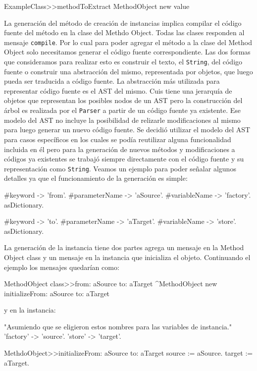 \begin{code}
ExampleClass>>methodToExtract MethodObject new value
\end{code}

La generación del método de creación de instancias implica compilar el código
fuente del método en la clase del Methdo Object. Todas las clases responden al
mensaje \lstinline{compile}. Por lo cual para poder agregar el método a la clase
del Method Object solo necesitamos generar el código fuente correspondiente. Las
dos formas que consideramos para realizar esto es construir el texto, el
\lstinline{String}, del código fuente o construir una abstracción del mismo,
representada por objetos, que luego pueda ser traducida a código fuente. La
abstracción más utilizada para representar código fuente es el AST del
mismo. Cuis tiene una jerarquía de objetos que representan los posibles nodos de
un AST pero la construcción del árbol es realizada por el \lstinline{Parser} a
partir de un código fuente ya existente. Ese modelo del AST no incluye la
posibilidad de relizarle modificaciones al mismo para luego generar un nuevo
código fuente. Se decidió utilizar el modelo del AST para casos específicos en
los cuales se podía reutilizar alguna funcionalidad incluida en él pero para la
generación de nuevos métodos y modificaciones a códigos ya existentes se trabajó
siempre directamente con el código fuente y su representación como
\lstinline{String}. Veamos un ejemplo para poder señalar algunos detalles ya que
el funcionamiento de la generación es simple:

\begin{code}
    { { #keyword -> 'from'.  #parameterName -> 'aSource'.  #variableName ->
        'factory'.  } asDictionary.

        { #keyword -> 'to'.  #parameterName -> 'aTarget'.  #variableName ->
          'store'.  } asDictionary.  }
\end{code}

La generación de la instancia tiene dos partes agrega un mensaje en la Method
Object class y un mensaje en la instancia que inicializa el objeto. Continuando
el ejemplo los mensajes quedarían como:

\begin{code}
MethodObject class>>from: aSource to: aTarget ^MethodObject new initializeFrom:
aSource to: aTarget
\end{code}

y en la instancia:

\begin{code}
"Asumiendo que se eligieron estos nombres para las variables de instancia."  {
    'factory' -> 'source'.  'store' -> 'target'.  }

MethdoObject>>initializeFrom: aSource to: aTarget source := aSource.  target :=
aTarget.
\end{code}

